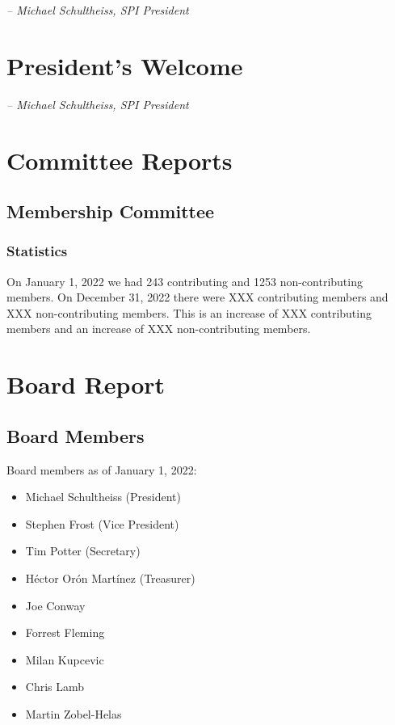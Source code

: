 \documentclass[a4paper]{report}
\begin{document}
  \emph{-- Michael Schultheiss, SPI President}

\newpage

\tableofcontents

\newpage

\chapter{President's Welcome}
\label{sec:president}

  \emph{-- Michael Schultheiss, SPI President}

\chapter{Committee Reports}
\section{Membership Committee}

\subsection{Statistics}

On January 1, 2022 we had 243 contributing and 1253 non-contributing members.  On December 31, 2022 there were XXX contributing members and XXX non-contributing members.  This is an increase of XXX contributing members and an increase of XXX non-contributing members.

\chapter{Board Report}
\section{Board Members}

Board members as of January 1, 2022:

\begin{itemize}
\item Michael Schultheiss (President)
\item Stephen Frost (Vice President)
\item Tim Potter (Secretary)
\item Héctor Orón Martínez (Treasurer)
\item Joe Conway
\item Forrest Fleming
\item Milan Kupcevic
\item Chris Lamb
\item Martin Zobel-Helas
\end{itemize}
\end{document}

